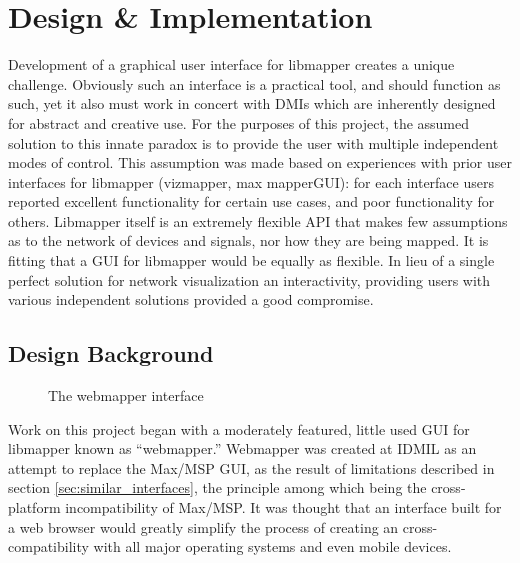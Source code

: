 \chapter{Design \& Implementation}

	Development of a graphical user interface for libmapper creates a unique challenge. Obviously such an interface is a practical tool, and should function as such, yet it also must work in concert with DMIs which are inherently designed for abstract and creative use. For the purposes of this project, the assumed solution to this innate paradox is to provide the user with multiple independent modes of control.  This assumption was made based on experiences with prior user interfaces for libmapper (vizmapper, max mapperGUI): for each interface users reported excellent functionality for certain use cases, and poor functionality for others. Libmapper itself is an extremely flexible API that makes few assumptions as to the network of devices and signals, nor how they are being mapped. It is fitting that a GUI for libmapper would be equally as flexible. In lieu of a single perfect solution for network visualization an interactivity, providing users with various independent solutions provided a good compromise.
	
\section{Design Background}

\begin{figure}[ht]
\centering
\caption{The webmapper interface}
\label{fig:webmapper}
\end{figure}

Work on this project began with a moderately featured, little used GUI for libmapper known as ``webmapper.'' Webmapper was created at IDMIL as an attempt to replace the Max/MSP GUI, as the result of limitations described in section \ref{sec:similar_interfaces}, the principle among which being the cross-platform incompatibility of Max/MSP. It was thought that an interface built for a web browser would greatly simplify the process of creating an cross-compatibility with all major operating systems and even mobile devices. 

